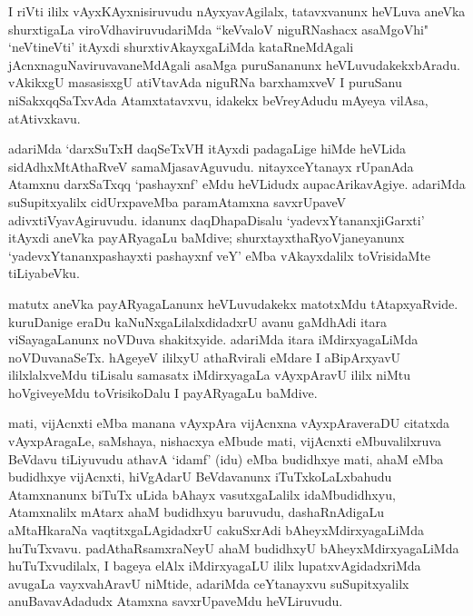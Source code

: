 
\begin{artha}
I riVti ililx vAyxKAyxnisiruvudu nAyxyavAgilalx, tatavxvanunx heVLuva aneVka shurxtigaLa viroVdhaviruvudariMda ``keVvaloV niguRNashacx asaMgoVhi" `neVtineVti' itAyxdi shurxtivAkayxgaLiMda kataRneMdAgali jAcnxnaguNaviruvavaneMdAgali asaMga puruSananunx heVLuvudakekxbAradu. vAkikxgU masasisxgU atiVtavAda niguRNa barxhamxveV I puruSanu niSakxqqSaTxvAda Atamxtatavxvu, idakekx beVreyAdudu mAyeya vilAsa, atAtivxkavu. 
\end{artha}

\begin{artha}
adariMda `darxSuTxH daqSeTxVH itAyxdi padagaLige hiMde heVLida sidAdhxMtAthaRveV samaMjasavAguvudu. nitayxceYtanayx rUpanAda Atamxnu darxSaTxqq `pashayxnf' eMdu heVLidudx aupacArikavAgiye. adariMda suSupitxyalilx cidUrxpaveMba paramAtamxna savxrUpaveV adivxtiVyavAgiruvudu. idanunx daqDhapaDisalu `yadevxYtananxjiGarxti' itAyxdi aneVka payARyagaLu baMdive; shurxtayxthaRyoVjaneyanunx `yadevxYtananxpashayxti pashayxnf veY' eMba vAkayxdalilx toVrisidaMte tiLiyabeVku. 
\end{artha}

\begin{artha}
matutx aneVka payARyagaLanunx heVLuvudakekx matotxMdu tAtapxyaRvide. kuruDanige eraDu kaNuNxgaLilalxdidadxrU avanu gaMdhAdi itara viSayagaLanunx noVDuva shakitxyide. adariMda itara iMdirxyagaLiMda noVDuvanaSeTx. hAgeyeV ililxyU athaRvirali eMdare I aBipArxyavU ililxlalxveMdu tiLisalu samasatx iMdirxyagaLa vAyxpAravU ililx niMtu hoVgiveyeMdu toVrisikoDalu I payARyagaLu baMdive. 
\end{artha}

\begin{artha}
mati, vijAcnxti eMba manana vAyxpAra vijAcnxna vAyxpAraveraDU citatxda vAyxpAragaLe, saMshaya, nishacxya eMbude mati, vijAcnxti eMbuvalilxruva BeVdavu tiLiyuvudu athavA `idamf' (idu) eMba budidhxye mati, ahaM eMba budidhxye vijAcnxti, hiVgAdarU BeVdavanunx iTuTxkoLaLxbahudu Atamxnanunx biTuTx uLida bAhayx vasutxgaLalilx idaMbudidhxyu, Atamxnalilx mAtarx ahaM budidhxyu baruvudu, dashaRnAdigaLu aMtaHkaraNa vaqtitxgaLAgidadxrU cakuSxrAdi bAheyxMdirxyagaLiMda huTuTxvavu. padAthaRsamxraNeyU ahaM budidhxyU bAheyxMdirxyagaLiMda huTuTxvudilalx, I bageya elAlx iMdirxyagaLU ililx lupatxvAgidadxriMda avugaLa vayxvahAravU niMtide, adariMda ceYtanayxvu suSupitxyalilx anuBavavAdadudx Atamxna savxrUpaveMdu heVLiruvudu.
\end{artha}%

